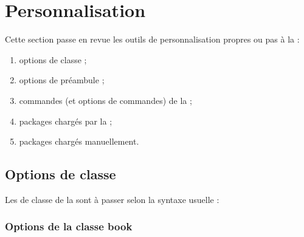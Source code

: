 \chapter{Personnalisation}\label{cha-configuration}

Cette section passe en revue les outils de personnalisation propres ou pas à la
\yatCl{} :
\begin{enumerate}
\item options de classe ;
\item options de préambule ;
\item commandes (et options de commandes) de la \yatCl;
\item packages chargés par la \yatCl ;
\item packages chargés manuellement.
\end{enumerate}

\section{Options de classe}\label{options-classe}

Les  de classe de la \yatCl sont à passer selon la syntaxe
usuelle :


\subsection{Options de la classe \textsf{book}}\label{sec-options-usuelles-de}

